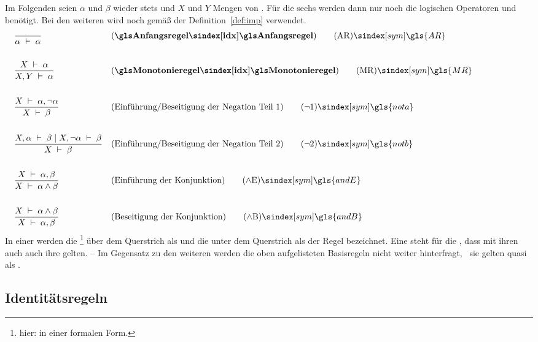 {Im Folgenden seien $\alpha$ und $\beta$ wieder stets  und $X$ und $Y$ Mengen von .
Für die sechs  werden dann nur noch die logischen Operatoren \chrqt{$\lnot$} und \chrqt{$\land$} benötigt.
Bei den weiteren  wird noch \chrqt{$\limp$} gemäß der Definition~\vref{def:imp} verwendet.
%
\begin{align}
	& \frac{}{\alpha\derive\alpha}
	& & (\text{\defn{\glsIdx{Anfangsregel}}})
	\tag{\tagAR} \sym{\gls{AR}} \label{def:Anfangsregel}
	\\\\
	& \frac{X\derive\alpha}{X,Y\derive\alpha}
	& & (\text{\defn{\glsIdx{Monotonieregel}}})
	\tag{\tagMR} \sym{\gls{MR}} \label{def:Monotonieregel}
	\\\\
	& \frac{X\derive\alpha,\lnot\alpha}{X\derive\beta}
	& & (\text{Einführung/Beseitigung der Negation Teil 1})
	\tag{\tagnota} \sym{\gls{nota}} \label{def:nota}
	\\\\
	& \frac{X,\alpha\derive\beta \srand X,\lnot\alpha\derive\beta}{X\derive\beta}
	& & (\text{Einführung/Beseitigung der Negation Teil 2})
	\tag{\tagnotb} \sym{\gls{notb}} \label{def:notb}
	\\\\
	& \frac{X\derive\alpha,\beta}{X\derive\alpha\land\beta}
	& & (\text{Einführung der Konjunktion})
	\tag{\tagandE} \sym{\gls{andE}} \label{def:andE}
	\\\\
	& \frac{X\derive\alpha\land\beta}{X\derive\alpha,\beta}
	& & (\text{Beseitigung der Konjunktion})
	\tag{\tagandB} \sym{\gls{andB}} \label{def:andB}
	\formulatoleft
\end{align}
%
In einer  werden die %
\footnote{hier:  in einer formalen Form.}
über dem Querstrich als  und die unter dem Querstrich als  der Regel bezeichnet.
Eine  steht für die , dass mit ihren  auch auch ihre  gelten.
-- Im Gegensatz zu den weiteren  werden die oben aufgelisteten Basisregeln nicht weiter hinterfragt, \textdh\ sie gelten quasi als \Axiome.

\subsection{Identitätsregeln}%
\label{sub:Identitätsregeln}

}
